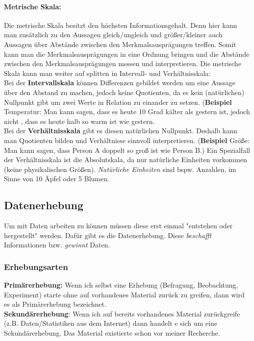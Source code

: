 \documentclass[a4paper]{article}
\begin{document}
\paragraph{Metrische Skala:} Die metrische Skala besitzt den höchsten Informationsgehalt. Denn hier kann man zusätzlich zu den Aussagen gleich/ungleich und größer/kleiner auch Aussagen über Abstände zwischen den Merkmalsausprägungen treffen. Somit kann man die Merkmalsausprägungen in eine Ordnung bringen und die Abstände zwischen den Merkmalsausprägungen messen und interpretieren. Die metrische Skala kann man weiter auf splitten in Intervall- und Verhältnisskala:\\
\noindent Bei der \textbf{Intervallskala} können Differenzen gebildet werden um eine Aussage über den Abstand zu machen, jedoch keine Quotienten, da es kein (natürlichen) Nullpunkt gibt um zwei Werte in Relation zu einander zu setzen. (\textbf{Beispiel} Temperatur: Man kann sagen, dass es heute 10 Grad kälter als gestern ist, jedoch nicht , dass es heute halb so warm ist wie gestern.\\
Bei der \textbf{Verhältnisskala} gibt es diesen natürlichen Nullpunkt. Deshalb kann man Quotienten bilden und Verhältnisse sinnvoll interpretieren. (\textbf{Beispiel} Größe: Man kann sagen, dass Person A doppelt so gro\ss{} ist wie Person B.)
Ein Spezialfall der Verhältnisskala ist die Absolutskala, da nur natürliche Einheiten vorkommen (keine physikalischen Größen). \textit{Nat\"urliche Einheiten} sind bspw. Anzahlen, im Sinne von 10 Äpfel oder 5 Blumen.

\subsection{Datenerhebung}
Um mit Daten arbeiten zu können müssen diese erst einmal "entstehen oder hergestellt" werden. Dafür gibt es die Datenerhebung. Diese \textit{beschafft} Informationen bzw. \textit{gewinnt} Daten.

\subsubsection{Erhebungsarten}

\textbf{Primärerhebung:} Wenn ich selbst eine Erhebung (Befragung, Beobachtung, Experiment) starte ohne auf vorhandenes Material zurück zu greifen, dann wird es als Primärerhebung bezeichnet.\\
\textbf{Sekundärerhebung}: Wenn ich auf bereits vorhandenes Material zurückgreife (z.B. Daten/Statistiken aus dem Internet) dann handelt e sich um eine Sekundärerhebung. Das Material existierte schon vor meiner Recherche.
\end{document}
